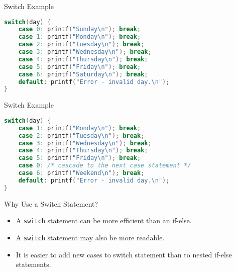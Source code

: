 \documentclass[graphics]{beamer}
\begin{document}
\begin{frame}[fragile]{Switch Example}
    \begin{lstlisting}[language=C,basicstyle=\footnotesize,keywordstyle=\color{blue},commentstyle=\color{green},showstringspaces=false,stringstyle=\color{red}]
switch(day) {
    case 0: printf("Sunday\n"); break;
    case 1: printf("Monday\n"); break;
    case 2: printf("Tuesday\n"); break;
    case 3: printf("Wednesday\n"); break;
    case 4: printf("Thursday\n"); break;
    case 5: printf("Friday\n"); break;
    case 6: printf("Saturday\n"); break;
    default: printf("Error - invalid day.\n");
}
\end{lstlisting}
\end{frame}

\begin{frame}[fragile]{Switch Example}
    \begin{lstlisting}[language=C,basicstyle=\footnotesize,keywordstyle=\color{blue},commentstyle=\color{green},showstringspaces=false,stringstyle=\color{red}]
switch(day) {
    case 1: printf("Monday\n"); break;
    case 2: printf("Tuesday\n"); break;
    case 3: printf("Wednesday\n"); break;
    case 4: printf("Thursday\n"); break;
    case 5: printf("Friday\n"); break;
    case 0: /* cascade to the next case statement */
    case 6: printf("Weekend\n"); break;
    default: printf("Error - invalid day.\n");
}
\end{lstlisting}
\end{frame}

\begin{frame}{Why Use a Switch Statement?}
    \begin{itemize}
        \item A \texttt{switch} statement can be more efficient than an if-else.
        \item A \texttt{switch} statement may also be more readable.
        \item It is easier to add new cases to switch statement than to nested if-else statements.
    \end{itemize}
\end{frame}
\end{document}
